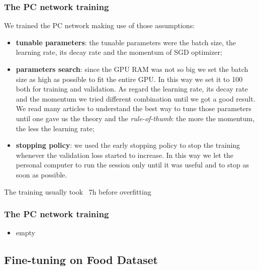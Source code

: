 \subsubsection{The PC network training}\label{sss:PC_training}
We trained the PC network making use of those assumptions:
\begin{itemize}
    \item \textbf{tunable parameters}: the tunable parameters were the batch size, the learning rate, its decay rate and the momentum of SGD optimizer;
    \item \textbf{parameters search}: since the GPU RAM was not so big we set the batch size as high as possible to fit the entire GPU. In this way we set it to 100 both for training and validation. As regard the learning rate, its decay rate and the momentum we tried different combination until we got a good result. We read many articles to understand the best way to tune those parameters until one \cite{SGD_momentum} gave us the theory and the \textit{rule-of-thumb}: the more the momentum, the less the learning rate;
    \item \textbf{stopping policy}: we used the early stopping policy to stop the training whenever the validation loss started to increase. In this way we let the personal computer to run the session only until it was useful and to stop as soon as possible.
\end{itemize}
The training usually took ~7h before overfitting


\subsubsection{The PC network training}\label{sss:GCP_training}
\begin{itemize}
    \item empty
\end{itemize}




\subsection{Fine-tuning on Food Dataset}



